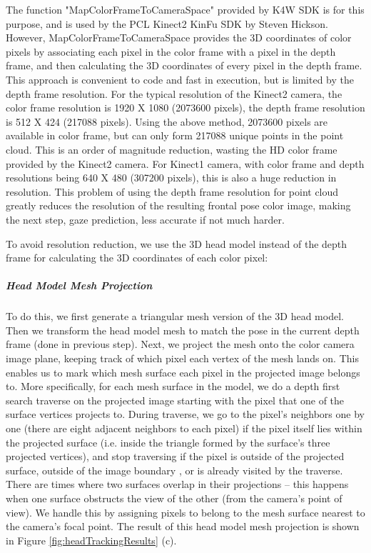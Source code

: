 \documentclass{ut-thesis}
\begin{document}
The function "MapColorFrameToCameraSpace" provided by K4W SDK is for this purpose, and is used by the PCL Kinect2 KinFu SDK by Steven Hickson.  However, MapColorFrameToCameraSpace provides the 3D coordinates of color pixels by associating each pixel in the color frame with a pixel in the depth frame, and then calculating the 3D coordinates of every pixel in the depth frame.  This approach is convenient to code and fast in execution, but is limited by the depth frame resolution.  For the typical resolution of the Kinect2 camera, the color frame resolution is 1920 X 1080 (2073600 pixels), the depth frame resolution is 512 X 424 (217088 pixels).  Using the above method, 2073600 pixels are available in color frame, but can only form 217088 unique points in the point cloud.  This is an order of magnitude reduction, wasting the HD color frame provided by the Kinect2 camera.  For Kinect1 camera, with color frame and depth resolutions being 640 X 480 (307200 pixels), this is also a huge reduction in resolution.  This problem of using the depth frame resolution for point cloud greatly reduces the resolution of the resulting frontal pose color image, making the next step, gaze prediction, less accurate if not much harder.

To avoid resolution reduction, we use the 3D head model instead of the depth frame for calculating the 3D coordinates of each color pixel:

\subparagraph{Head Model Mesh Projection}
To do this, we first generate a triangular mesh version of the 3D head model.  Then we transform the head model mesh to match the pose in the current depth frame (done in previous step).  Next, we project the mesh onto the color camera image plane, keeping track of which pixel each vertex of the mesh lands on.  This enables us to mark which mesh surface each pixel in the projected image belongs to.  More specifically, for each mesh surface in the model, we do a depth first search traverse on the projected image starting with the pixel that one of the surface vertices projects to.  During traverse, we go to the pixel's neighbors one by one (there are eight adjacent neighbors to each pixel) if the pixel itself lies within the projected surface (i.e. inside the triangle formed by the surface's three projected vertices), and stop traversing if the pixel is outside of the projected surface, outside of the image boundary , or is already visited by the traverse.  There are times where two surfaces overlap in their projections -- this happens when one surface obstructs the view of the other (from the camera's point of view).  We handle this by assigning pixels to belong to the mesh surface nearest to the camera's focal point.  The result of this head model mesh projection is shown in Figure \ref{fig:headTrackingResults} (c).
\end{document}
